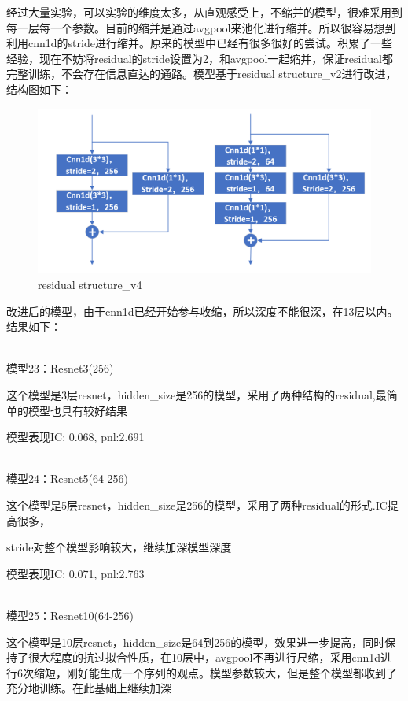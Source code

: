 \documentclass[11pt]{ctexart}
\begin{document}
经过大量实验，可以实验的维度太多，从直观感受上，不缩并的模型，很难采用到每一层每一个参数。目前的缩并是通过avgpool来池化进行缩并。所以很容易想到利用cnn1d的stride进行缩并。原来的模型中已经有很多很好的尝试。积累了一些经验，现在不妨将residual的stride设置为2，和avgpool一起缩并，保证residual都完整训练，不会存在信息直达的通路。模型基于residual structure\_v2进行改进，结构图如下：
\begin{figure}[H]

\begin{center}
\includegraphics[width=1.0\textwidth]{residual5.PNG}
\end{center}
\caption{residual structure\_v4}
\label{FIG.6}
\end{figure}

改进后的模型，由于cnn1d已经开始参与收缩，所以深度不能很深，在13层以内。结果如下：

~\\
模型23：Resnet3(256)

这个模型是3层resnet，hidden\_size是256的模型，采用了两种结构的residual,最简单的模型也具有较好结果

模型表现{\kaishu \small IC: 0.068, pnl:2.691}

~\\
模型24：Resnet5(64-256)

这个模型是5层resnet，hidden\_size是256的模型，采用了两种residual的形式.IC提高很多，\par stride对整个模型影响较大，继续加深模型深度

模型表现{\kaishu \small IC: 0.071, pnl:2.763}

~\\
模型25：Resnet10(64-256)

这个模型是10层resnet，hidden\_size是64到256的模型，效果进一步提高，同时保持了很大程度的抗过拟合性质，在10层中，avgpool不再进行尺缩，采用cnn1d进行6次缩短，刚好能生成一个序列的观点。模型参数较大，但是整个模型都收到了充分地训练。在此基础上继续加深
\end{document}
